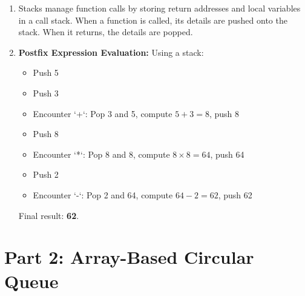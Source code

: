 \documentclass[12pt]{article}
\begin{document}
\begin{enumerate}
    \item Stacks manage function calls by storing return addresses and local variables in a call stack. When a function is called, its details are pushed onto the stack. When it returns, the details are popped.
    
    \item \textbf{Postfix Expression Evaluation:} Using a stack:
    \begin{itemize}
        \item Push 5
        \item Push 3
        \item Encounter `+`: Pop 3 and 5, compute $5+3=8$, push 8
        \item Push 8
        \item Encounter `*`: Pop 8 and 8, compute $8 \times 8 = 64$, push 64
        \item Push 2
        \item Encounter `-`: Pop 2 and 64, compute $64 - 2 = 62$, push 62
    \end{itemize}
    Final result: \textbf{62}.

\end{enumerate}

\newpage

\section*{Part 2: Array-Based Circular Queue}
\end{document}
